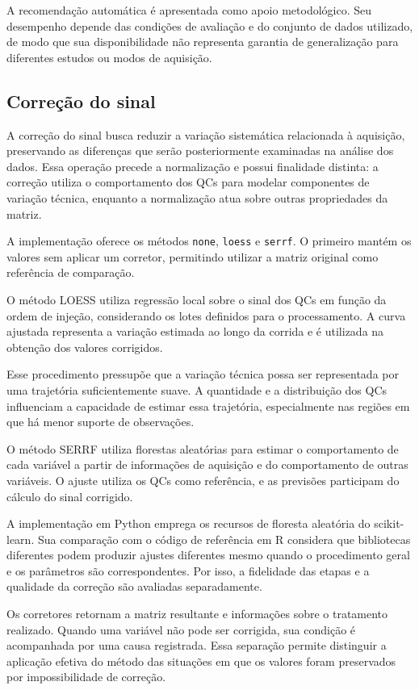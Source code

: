 A recomendação automática é apresentada como apoio metodológico. Seu desempenho depende das condições de avaliação e do conjunto de dados utilizado, de modo que sua disponibilidade não representa garantia de generalização para diferentes estudos ou modos de aquisição.

\subsection{Correção do sinal}
\label{subsec:correcao-sinal}

A correção do sinal busca reduzir a variação sistemática relacionada à aquisição, preservando as diferenças que serão posteriormente examinadas na análise dos dados. Essa operação precede a normalização e possui finalidade distinta: a correção utiliza o comportamento dos QCs para modelar componentes de variação técnica, enquanto a normalização atua sobre outras propriedades da matriz.

A implementação oferece os métodos \texttt{none}, \texttt{loess} e \texttt{serrf}. O primeiro mantém os valores sem aplicar um corretor, permitindo utilizar a matriz original como referência de comparação.

O método LOESS utiliza regressão local sobre o sinal dos QCs em função da ordem de injeção, considerando os lotes definidos para o processamento. A curva ajustada representa a variação estimada ao longo da corrida e é utilizada na obtenção dos valores corrigidos.

Esse procedimento pressupõe que a variação técnica possa ser representada por uma trajetória suficientemente suave. A quantidade e a distribuição dos QCs influenciam a capacidade de estimar essa trajetória, especialmente nas regiões em que há menor suporte de observações.

O método SERRF utiliza florestas aleatórias para estimar o comportamento de cada variável a partir de informações de aquisição e do comportamento de outras variáveis. O ajuste utiliza os QCs como referência, e as previsões participam do cálculo do sinal corrigido.

A implementação em Python emprega os recursos de floresta aleatória do scikit-learn. Sua comparação com o código de referência em R considera que bibliotecas diferentes podem produzir ajustes diferentes mesmo quando o procedimento geral e os parâmetros são correspondentes. Por isso, a fidelidade das etapas e a qualidade da correção são avaliadas separadamente.

Os corretores retornam a matriz resultante e informações sobre o tratamento realizado. Quando uma variável não pode ser corrigida, sua condição é acompanhada por uma causa registrada. Essa separação permite distinguir a aplicação efetiva do método das situações em que os valores foram preservados por impossibilidade de correção.

